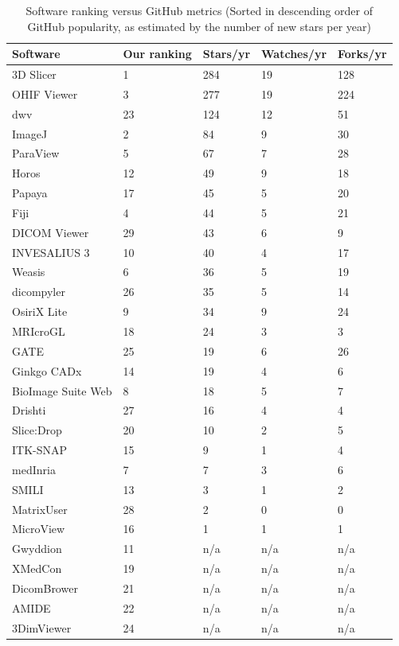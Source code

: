 \documentclass[final, 3p, times, authoryear]{elsarticle}
\begin{document}
\begingroup
\renewcommand{\arraystretch}{0.85}
\begin{table}[!ht]
\centering
\begin{tabular}{lllll}
\toprule
Software & Our ranking & Stars/yr & Watches/yr & Forks/yr \\ 
\midrule
3D Slicer & 1 & 284 & 19 & 128 \\
OHIF Viewer & 3 & 277 & 19 & 224 \\
dwv & 23 & 124 & 12 & 51 \\
ImageJ & 2 & 84 & 9 & 30 \\
ParaView & 5 & 67 & 7 & 28 \\
Horos & 12 & 49 & 9 & 18 \\
Papaya & 17 & 45 & 5 & 20 \\
Fiji & 4 & 44 & 5 & 21 \\
DICOM Viewer & 29 & 43 & 6 & 9 \\
INVESALIUS 3 & 10 & 40 & 4 & 17 \\
Weasis & 6 & 36 & 5 & 19 \\
dicompyler & 26 & 35 & 5 & 14 \\
OsiriX Lite & 9 & 34 & 9 & 24 \\
MRIcroGL & 18 & 24 & 3 & 3 \\
GATE & 25 & 19 & 6 & 26 \\
Ginkgo CADx & 14 & 19 & 4 & 6 \\
BioImage Suite Web & 8 & 18 & 5 & 7 \\
Drishti & 27 & 16 & 4 & 4 \\
Slice:Drop & 20 & 10 & 2 & 5 \\
ITK-SNAP & 15 & 9 & 1 & 4 \\
medInria & 7 & 7 & 3 & 6 \\
SMILI & 13 & 3 & 1 & 2 \\
MatrixUser & 28 & 2 & 0 & 0 \\
MicroView & 16 & 1 & 1 & 1 \\
Gwyddion & 11 & n/a & n/a & n/a \\
XMedCon & 19 & n/a & n/a & n/a \\
DicomBrower & 21 & n/a & n/a & n/a \\
AMIDE & 22 & n/a & n/a & n/a \\
3DimViewer & 24 & n/a & n/a & n/a \\ 
\bottomrule
\end{tabular}
\caption{\label{tab_ranking_vs_GitHub}Software ranking versus GitHub metrics
(Sorted in descending order of GitHub popularity, as estimated by the number of
new stars per year)}
\end{table}
\endgroup
\end{document}
